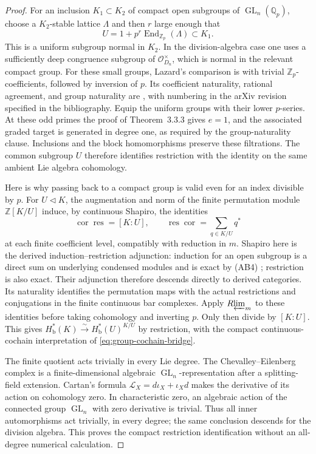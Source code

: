 \documentclass[11pt]{article}
\numberwithin{equation}{section}
\theoremstyle{definition}
\theoremstyle{remark}
\newcommand{\Q}{\mathbb Q}
\newcommand{\Z}{\mathbb Z}
\newcommand{\cO}{\mathcal O}
\DeclareMathOperator{\GL}{GL}
\DeclareMathOperator{\End}{End}
\newcommand{\Rlim}{R\!\varprojlim}
\begin{document}
\begin{proof}
For an inclusion \(K_1\subset K_2\) of compact open subgroups of
\(\GL_n(\Q_p)\), choose a \(K_2\)-stable lattice \(\Lambda\) and then
\(r\) large enough that
\[
 U=1+p^r\End_{\Z_p}(\Lambda)\subset K_1.
\]
This is a uniform subgroup normal in \(K_2\). In the division-algebra
case one uses a sufficiently deep congruence subgroup of
\(\cO_{D_n}^{\times}\), which is normal in the relevant compact group.
For these small groups, Lazard's comparison is
\cite[Theorem~3.3.3 and Remark~3.3.4]{HKN2011} with trivial
\(\Z_p\)-coefficients, followed by inversion of \(p\).
Its coefficient naturality, rational agreement, and group naturality are
\cite[Theorem~3.1.1(1)--(3)]{HKN2011}, with numbering in the arXiv
revision specified in the bibliography. Equip the uniform groups with
their lower \(p\)-series. At these odd primes the proof of
Theorem~3.3.3 gives \(e=1\), and the associated graded target is generated
in degree one, as required by the group-naturality clause. Inclusions and
the block homomorphisms preserve these filtrations. The common subgroup
\(U\) therefore identifies restriction with the identity on the same
ambient Lie algebra cohomology.

Here is why passing back to a compact group is valid even for an index
divisible by \(p\). For \(U\triangleleft K\), the augmentation and norm
of the finite permutation module \(\Z[K/U]\) induce, by continuous
Shapiro, the identities
\[
 \operatorname{cor}\operatorname{res}=[K:U],\qquad
 \operatorname{res}\operatorname{cor}
      =\sum_{q\in K/U}q^*
\]
at each finite coefficient level, compatibly with reduction in \(m\).
Shapiro here is the derived induction--restriction adjunction: induction
for an open subgroup is a direct sum on underlying condensed modules and
is exact by (AB4) \cite[Theorems~2.2 and~2.4]{Tang2026}; restriction is
also exact. Their adjunction therefore descends directly to derived
categories. Its naturality identifies the
permutation maps with the actual restrictions and conjugations in the
finite continuous bar complexes. Apply \(\Rlim_m\) to these identities
before taking cohomology and inverting \(p\). Only then divide by
\([K:U]\). This gives
\(H^*_{\mathrm b}(K)\xrightarrow{\sim}H^*_{\mathrm b}(U)^{K/U}\)
by restriction, with the compact
continuous-cochain interpretation of \eqref{eq:group-cochain-bridge}.

The finite quotient acts trivially in every Lie degree. The
Chevalley--Eilenberg complex is a finite-dimensional algebraic
\(\GL_n\)-representation after a splitting-field extension. Cartan's
formula \(\mathcal L_X=d\iota_X+\iota_Xd\) makes the derivative of its
action on cohomology zero. In characteristic zero, an algebraic action
of the connected group \(\GL_n\) with zero derivative is trivial.
Thus all inner automorphisms act trivially, in every degree; the same
conclusion descends for the division algebra. This proves the compact
restriction identification without an all-degree numerical calculation.


\end{proof}
\end{document}
